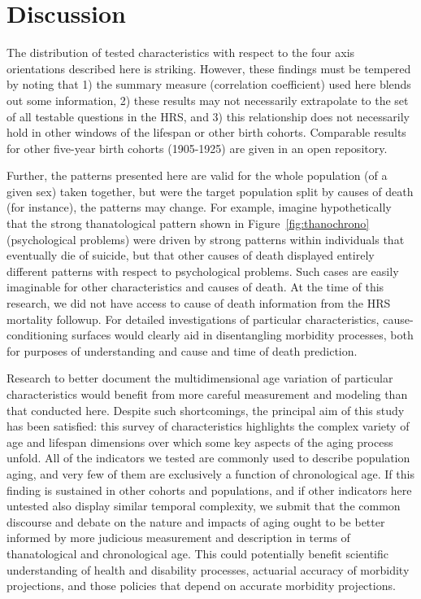 \documentclass[11pt,oneside]{article} %
\begin{document}
\section*{Discussion}
The distribution of tested characteristics with respect to the
four axis orientations described here is striking. However, these findings
must be tempered by noting that 1) the summary measure (correlation coefficient)
used here blends out some information, 2) these results may
not necessarily extrapolate to the set of all testable questions in the HRS, and
3) this relationship does not necessarily hold in other windows of the lifespan
or other birth cohorts. Comparable results for other five-year birth cohorts
(1905-1925) are given in an open repository.

Further, the patterns
presented here are valid for the whole population (of a given sex) taken
together, but were the target population split by causes of death (for
instance), the patterns may change. For example, imagine hypothetically that the
strong thanatological pattern shown in Figure~\ref{fig:thanochrono}
(psychological problems) were driven by strong patterns within individuals that
eventually die of suicide, but that other causes of death displayed entirely different patterns with respect to
psychological problems. Such cases are easily imaginable for other
characteristics and causes of death. At the time of this research, we did not
have access to cause of death information from the HRS mortality followup. For
detailed investigations of particular characteristics, cause-conditioning
surfaces would clearly aid in disentangling morbidity processes, both for
purposes of understanding and cause and time of death prediction.

Research to better document the multidimensional age variation of particular
characteristics would benefit from more careful measurement and modeling than
that conducted here.
Despite such shortcomings, the principal aim of this study has been satisfied:
this survey of characteristics highlights the complex variety of age and
lifespan dimensions over which some key aspects of the aging process unfold. All
of the indicators we tested are commonly used to describe population aging, and
very few of them are exclusively a function of chronological age. If this
finding is sustained in other cohorts and populations, and if other indicators
here untested also display similar temporal complexity, we submit that the
common discourse and debate on the nature and impacts of aging ought to be
better informed by more judicious measurement and description in terms of
thanatological and chronological age. This could potentially benefit scientific
understanding of health and disability processes, actuarial accuracy of
morbidity projections, and those policies that depend on accurate
morbidity projections. 
\end{document}
